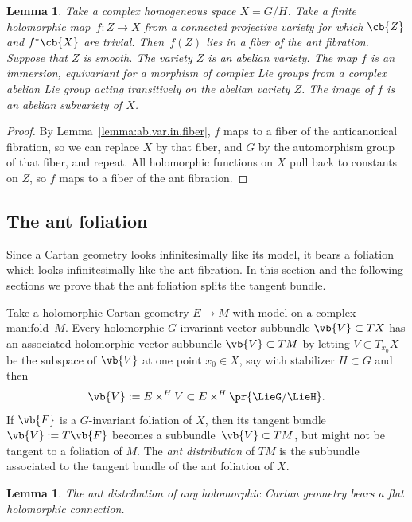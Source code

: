 \documentclass[pdftex]{sigma}
\numberwithin{equation}{section}
\newtheorem{Lemma}[Theorem]{Lemma}
\begin{document}
\begin{Lemma}\label{lemma:ab.var.in.fiber.2}
Take a complex homogeneous space $X = G/H$.
Take a finite holomorphic map~${f \colon Z \to X}$ from a connected projective variety for which $\cb{Z}$ and $f^*\cb{X}$ are trivial.
Then~$f(Z)$ lies in a fiber of the ant fibration.
Suppose that $Z$ is smooth.
The variety $Z$ is an abelian variety.
The map $f$ is an immersion, equivariant for a morphism of complex Lie groups from a complex abelian Lie group acting transitively on the abelian variety $Z$.
The image of $f$ is an abelian subvariety of $X$.
\end{Lemma}

\begin{proof}
By Lemma~\ref{lemma:ab.var.in.fiber}, $f$ maps to a fiber of the anticanonical fibration, so we can replace $X$ by that fiber, and $G$ by the automorphism group of that fiber, and repeat.
All holomorphic functions on $X$ pull back to constants on $Z$, so $f$ maps to a fiber of the ant fibration.
\end{proof}

\subsection{The ant foliation}
Since a Cartan geometry looks infinitesimally like its model, it bears a foliation which looks infinitesimally like the ant fibration.
In this section and the following sections we prove that the ant foliation splits the tangent bundle.

Take a holomorphic Cartan geometry $E \to M$ with model  on a complex manifold~$M$.
Every holomorphic $G$-invariant vector subbundle $\vb{V} \subset TX$ has an associated
holomorphic vector subbundle $\vb{V} \subset TM$ by letting $V \subset T_{x_0} X$ be the
subspace of $\vb{V}$ at one point $x_0 \in X$, say with stabilizer $H \subset G$ and then
\[
\vb{V} := E \times^H V \subset E \times^H \pr{\LieG/\LieH}.
\]
If $\vb{F}$ is a $G$-invariant foliation of $X$, then its tangent bundle $\vb{V} := T\vb{F}$
becomes a subbundle~${\vb{V} \subset TM}$, but might not be tangent to a foliation of $M$.
The \emph{ant distribution} of $TM$ is the subbundle associated to the tangent bundle of the ant
foliation of $X$.

\begin{Lemma}
The ant distribution of any holomorphic Cartan geometry bears a flat holomorphic connection.
\end{Lemma}
\end{document}
